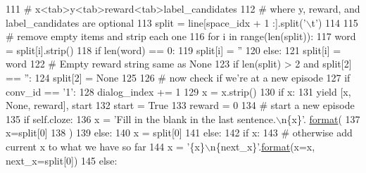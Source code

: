 \begin{DoxyCode}
111                 \textcolor{comment}{# x<tab>y<tab>reward<tab>label\_candidates}
112                 \textcolor{comment}{# where y, reward, and label\_candidates are optional}
113                 split = line[space\_idx + 1 :].split(\textcolor{stringliteral}{'\(\backslash\)t'})
114 
115                 \textcolor{comment}{# remove empty items and strip each one}
116                 \textcolor{keywordflow}{for} i \textcolor{keywordflow}{in} range(len(split)):
117                     word = split[i].strip()
118                     \textcolor{keywordflow}{if} len(word) == 0:
119                         split[i] = \textcolor{stringliteral}{''}
120                     \textcolor{keywordflow}{else}:
121                         split[i] = word
122                 \textcolor{comment}{# Empty reward string same as None}
123                 \textcolor{keywordflow}{if} len(split) > 2 \textcolor{keywordflow}{and} split[2] == \textcolor{stringliteral}{''}:
124                     split[2] = \textcolor{keywordtype}{None}
125 
126                 \textcolor{comment}{# now check if we're at a new episode}
127                 \textcolor{keywordflow}{if} conv\_id == \textcolor{stringliteral}{'1'}:
128                     dialog\_index += 1
129                     x = x.strip()
130                     \textcolor{keywordflow}{if} x:
131                         \textcolor{keywordflow}{yield} [x, \textcolor{keywordtype}{None}, reward], start
132                     start = \textcolor{keyword}{True}
133                     reward = 0
134                     \textcolor{comment}{# start a new episode}
135                     \textcolor{keywordflow}{if} self.cloze:
136                         x = \textcolor{stringliteral}{'Fill in the blank in the last sentence.\(\backslash\)n\{x\}'}.
      \hyperlink{namespaceparlai_1_1chat__service_1_1services_1_1messenger_1_1shared__utils_a32e2e2022b824fbaf80c747160b52a76}{format}(
137                             x=split[0]
138                         )
139                     \textcolor{keywordflow}{else}:
140                         x = split[0]
141                 \textcolor{keywordflow}{else}:
142                     \textcolor{keywordflow}{if} x:
143                         \textcolor{comment}{# otherwise add current x to what we have so far}
144                         x = \textcolor{stringliteral}{'\{x\}\(\backslash\)n\{next\_x\}'}.\hyperlink{namespaceparlai_1_1chat__service_1_1services_1_1messenger_1_1shared__utils_a32e2e2022b824fbaf80c747160b52a76}{format}(x=x, next\_x=split[0])
145                     \textcolor{keywordflow}{else}:

\end{DoxyCode}
